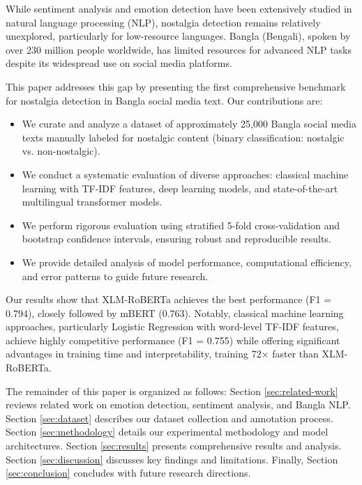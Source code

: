 \documentclass[conference]{IEEEtran}
\begin{document}
While sentiment analysis and emotion detection have been extensively studied in natural language processing (NLP), nostalgia detection remains relatively unexplored, particularly for low-resource languages. Bangla (Bengali), spoken by over 230 million people worldwide, has limited resources for advanced NLP tasks despite its widespread use on social media platforms.

This paper addresses this gap by presenting the first comprehensive benchmark for nostalgia detection in Bangla social media text. Our contributions are:

\begin{itemize}
\item We curate and analyze a dataset of approximately 25,000 Bangla social media texts manually labeled for nostalgic content (binary classification: nostalgic vs. non-nostalgic).
\item We conduct a systematic evaluation of diverse approaches: classical machine learning with TF-IDF features, deep learning models, and state-of-the-art multilingual transformer models.
\item We perform rigorous evaluation using stratified 5-fold cross-validation and bootstrap confidence intervals, ensuring robust and reproducible results.
\item We provide detailed analysis of model performance, computational efficiency, and error patterns to guide future research.
\end{itemize}

Our results show that XLM-RoBERTa achieves the best performance (F1 = 0.794), closely followed by mBERT (0.763). Notably, classical machine learning approaches, particularly Logistic Regression with word-level TF-IDF features, achieve highly competitive performance (F1 = 0.755) while offering significant advantages in training time and interpretability, training 72× faster than XLM-RoBERTa.

The remainder of this paper is organized as follows: Section \ref{sec:related-work} reviews related work on emotion detection, sentiment analysis, and Bangla NLP. Section \ref{sec:dataset} describes our dataset collection and annotation process. Section \ref{sec:methodology} details our experimental methodology and model architectures. Section \ref{sec:results} presents comprehensive results and analysis. Section \ref{sec:discussion} discusses key findings and limitations. Finally, Section \ref{sec:conclusion} concludes with future research directions.
\end{document}
